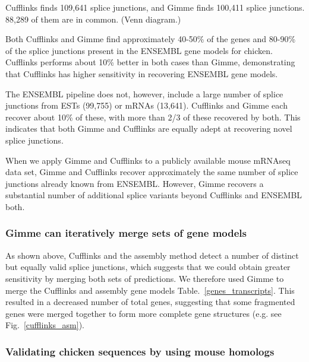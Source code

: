 \documentclass[10pt]{article}
\begin{document}
Cufflinks finds 109,641 splice junctions, and Gimme finds 100,411
splice junctions.  88,289 of them are in common.  (Venn diagram.)

Both Cufflinks and Gimme find approximately 40-50\% of the genes and
80-90\% of the splice junctions present in the ENSEMBL gene models
for chicken.  Cufflinks performs about 10\% better in both cases
than Gimme, demonstrating that Cufflinks has higher sensitivity
in recovering ENSEMBL gene models.

The ENSEMBL pipeline does not, however, include a large number of
splice junctions from ESTs (99,755) or mRNAs (13,641).  Cufflinks and
Gimme each recover about 10\% of these, with more than 2/3 of these
recovered by both.  This indicates that both Gimme and Cufflinks
are equally adept at recovering novel splice junctions.

When we apply Gimme and Cufflinks to a publicly available mouse
mRNAseq data set, Gimme and Cufflinks recover approximately the same
number of splice junctions already known from ENSEMBL.  However, Gimme
recovers a substantial number of additional splice variants beyond
Cufflinks and ENSEMBL both.


\subsubsection*{Gimme can iteratively merge sets of gene models}


As shown above, Cufflinks and the assembly method detect a number of
distinct but equally valid splice junctions, which suggests that we
could obtain greater sensitivity by merging both sets of predictions.
We therefore used Gimme to merge the Cufflinks and assembly gene
models Table.~\ref{genes_transcripts}.  This resulted in a decreased
number of total genes, suggesting that some fragmented genes were
merged together to form more complete gene structures (e.g. see
Fig.~\ref{cufflinks_asm}).

\subsubsection*{Validating chicken sequences by using mouse homologs}
\end{document}
